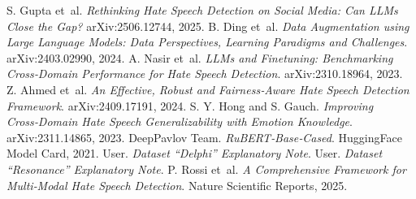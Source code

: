 \documentclass{article}
\begin{document}
\begin{thebibliography}{9}
 S. Gupta et~al. \textit{Rethinking Hate Speech Detection on Social Media: Can LLMs Close the Gap?} arXiv:2506.12744, 2025.
 B. Ding et~al. \textit{Data Augmentation using Large Language Models: Data Perspectives, Learning Paradigms and Challenges}. arXiv:2403.02990, 2024.
 A. Nasir et~al. \textit{LLMs and Finetuning: Benchmarking Cross‑Domain Performance for Hate Speech Detection}. arXiv:2310.18964, 2023.
 Z. Ahmed et~al. \textit{An Effective, Robust and Fairness‑Aware Hate Speech Detection Framework}. arXiv:2409.17191, 2024.
 S. Y. Hong and S. Gauch. \textit{Improving Cross‑Domain Hate Speech Generalizability with Emotion Knowledge}. arXiv:2311.14865, 2023.
 DeepPavlov Team. \textit{RuBERT‑Base‑Cased}. HuggingFace Model Card, 2021.
 User. \textit{Dataset ``Delphi'' Explanatory Note}.
 User. \textit{Dataset ``Resonance'' Explanatory Note}.
 P. Rossi et~al. \textit{A Comprehensive Framework for Multi‑Modal Hate Speech Detection}. Nature Scientific Reports, 2025.
\end{thebibliography}
\end{document}
